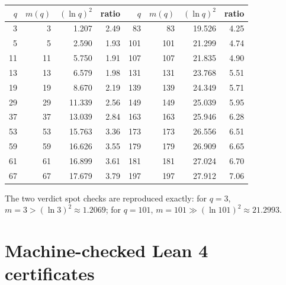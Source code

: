 \documentclass[11pt]{article}
\theoremstyle{definition}
\begin{document}
\begin{center}
\begin{tabular}{rrrr@{\hspace{2em}}rrrr}
\toprule
$q$ & $m(q)$ & $(\ln q)^2$ & ratio & $q$ & $m(q)$ & $(\ln q)^2$ & ratio\\
\midrule
3   & 3   & 1.207  & 2.49 & 83  & 83  & 19.526 & 4.25\\
5   & 5   & 2.590  & 1.93 & 101 & 101 & 21.299 & 4.74\\
11  & 11  & 5.750  & 1.91 & 107 & 107 & 21.835 & 4.90\\
13  & 13  & 6.579  & 1.98 & 131 & 131 & 23.768 & 5.51\\
19  & 19  & 8.670  & 2.19 & 139 & 139 & 24.349 & 5.71\\
29  & 29  & 11.339 & 2.56 & 149 & 149 & 25.039 & 5.95\\
37  & 37  & 13.039 & 2.84 & 163 & 163 & 25.946 & 6.28\\
53  & 53  & 15.763 & 3.36 & 173 & 173 & 26.556 & 6.51\\
59  & 59  & 16.626 & 3.55 & 179 & 179 & 26.909 & 6.65\\
61  & 61  & 16.899 & 3.61 & 181 & 181 & 27.024 & 6.70\\
67  & 67  & 17.679 & 3.79 & 197 & 197 & 27.912 & 7.06\\
\bottomrule
\end{tabular}
\end{center}

The two verdict spot checks are reproduced exactly: for $q=3$,
$m=3 > (\ln 3)^2 \approx 1.2069$; for $q=101$, $m=101 \gg (\ln 101)^2 \approx
21.2993$.

\section{Machine-checked Lean 4 certificates}
\end{document}
